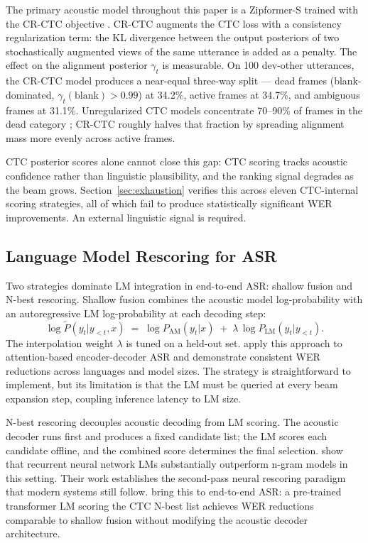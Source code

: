 The primary acoustic model throughout this paper is a Zipformer-S \cite{yao2024zipformer} trained with the CR-CTC objective \cite{huang2024crctc}. CR-CTC augments the CTC loss with a consistency regularization term: the KL divergence between the output posteriors of two stochastically augmented views of the same utterance is added as a penalty. The effect on the alignment posterior $\gamma_t$ is measurable. On 100 dev-other utterances, the CR-CTC model produces a near-equal three-way split — dead frames (blank-dominated, $\gamma_t(\text{blank}) > 0.99$) at 34.2\%, active frames at 34.7\%, and ambiguous frames at 31.1\%. Unregularized CTC models concentrate 70–90\% of frames in the dead category \cite{graves2006ctc}; CR-CTC roughly halves that fraction by spreading alignment mass more evenly across active frames.

CTC posterior scores alone cannot close this gap: CTC scoring tracks acoustic confidence rather than linguistic plausibility, and the ranking signal degrades as the beam grows. Section~\ref{sec:exhaustion} verifies this across eleven CTC-internal scoring strategies, all of which fail to produce statistically significant WER improvements. An external linguistic signal is required.



\subsection{Language Model Rescoring for ASR}

Two strategies dominate LM integration in end-to-end ASR: shallow fusion and N-best rescoring. Shallow fusion \cite{gulcehre2015fusion} combines the acoustic model log-probability with an autoregressive LM log-probability at each decoding step:
\begin{equation*}
\log \tilde{P}(y_t | y_{<t}, x) \;=\; \log P_\text{AM}(y_t | x) \;+\; \lambda\, \log P_\text{LM}(y_t | y_{<t}).
\end{equation*}
The interpolation weight $\lambda$ is tuned on a held-out set. \citet{hori2017advances} apply this approach to attention-based encoder-decoder ASR and demonstrate consistent WER reductions across languages and model sizes. The strategy is straightforward to implement, but its limitation is that the LM must be queried at every beam expansion step, coupling inference latency to LM size.

N-best rescoring decouples acoustic decoding from LM scoring. The acoustic decoder runs first and produces a fixed candidate list; the LM scores each candidate offline, and the combined score determines the final selection. \citet{mikolov2010recurrent} show that recurrent neural network LMs substantially outperform n-gram models in this setting. Their work establishes the second-pass neural rescoring paradigm that modern systems still follow. \citet{shin2019effective} bring this to end-to-end ASR: a pre-trained transformer LM scoring the CTC N-best list achieves WER reductions comparable to shallow fusion without modifying the acoustic decoder architecture.

